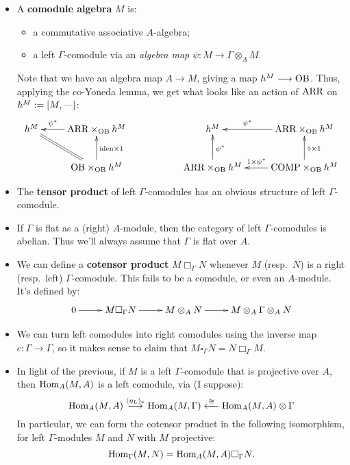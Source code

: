 \documentclass[11pt]{article}
\newcommand\OB{\textup{OB}}
\newcommand\ARR{\textup{ARR}}
\newcommand\COMP{\textup{COMP}}
\begin{document}
\begin{Gamma-comodules}
\begin{itemize}
\begin{itemize}
\end{itemize}
\item A \textbf{comodule algebra} $M$ is:
\begin{itemize}\squishlist
\item a commutative associative $A$-algebra;
\item a left $\Gamma$-comodule via an \emph{algebra map} $\psi:M\to\Gamma\otimes_A M$.
\end{itemize}
Note that we have an algebra map $A\to M$, giving a map $h^M\to\OB$. Thus, applying the co-Yoneda lemma, we get what looks like an action of $\ARR$ on $h^M:=[M,\textup{---}]$:
\[\xymatrix{
h^M\ar[r];[]_-{\psi^*}&\ARR\times_\OB h^M\ar[d];[]_{\textup{iden}\times1}&&
h^M\ar[d];[]_{\psi^*}\ar[r];[]_-{\psi^*}& \ARR\times_\OB h^M\ar[d];[]_{\circ\times1}\\
&\OB\times_\OB h^M\ar@{=}[ul];[]&&
\ARR\times_\OB h^M\ar[r];[]_-{1\times\psi^*}& \COMP\times_\OB h^M
}\]
\item The \textbf{tensor product} of left $\Gamma$-comodules has an obvious structure of left $\Gamma$-comodule.
\item If $\Gamma$ is flat as a (right) $A$-module, then the category of left $\Gamma$-comodules is abelian. Thus we'll always assume that $\Gamma$ is flat over $A$.
\item We can define a \textbf{cotensor product} $M\Box_\Gamma N$ whenever $M$ (resp.\ $N$) is a right (resp.\ left) $\Gamma$-comodule. This fails to be a comodule, or even an $A$-module. It's defined by:
\[\xymatrix{
0\ar[r]&
M\square_\Gamma N\ar[r]&
M\otimes_AN\ar[r]&
M\otimes_A\Gamma\otimes_AN
}\]

\item We can turn left comodules into right comodules using the inverse map $c:\Gamma\to\Gamma$, so it makes sense to claim that $M\square_\Gamma N=N\Box_\Gamma M$.

\item In light of the previous, if $M$ is a left $\Gamma$-comodule that is projective over $A$, then $\operatorname{Hom}_A(M,A)$ is a left comodule, via (I suppose):
\[\operatorname{Hom}_A(M,A)\overset{(\eta_L)_*}{\longrightarrow}\operatorname{Hom}_A(M,\Gamma)\overset{\cong}{\longleftarrow} \operatorname{Hom}_A(M,A)\otimes\Gamma\]
In particular, we can form the cotensor product in the following isomorphism, for left $\Gamma$-modules $M$ and $N$ with $M$ projective:
\[\operatorname{Hom}_\Gamma(M,N)=\operatorname{Hom}_{A}(M,A)\square_\Gamma N.\]
\end{itemize}
\end{Gamma-comodules}
\end{document}
